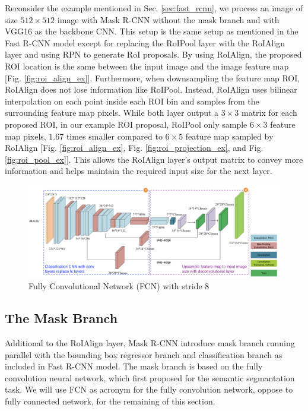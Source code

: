 Reconsider the example mentioned in Sec. \ref{sec:fast_rcnn}, we process an image of size $512 \times 512$ image with Mask R-CNN without the mask branch and with VGG16 as the backbone CNN. This setup is the same setup as mentioned in the Fast R-CNN model except for replacing the RoIPool layer with the RoIAlign layer and using RPN to generate RoI proposals. By using RoIAlign, the proposed ROI location is the same between the input image and the image feature map [Fig. \ref{fig:roi_align_ex}]. Furthermore, when downsampling the feature map ROI, RoIAlign does not lose information like RoIPool. Instead, RoIAlign uses bilinear interpolation on each point inside each ROI bin and samples from the surrounding feature map pixels. While both layer output a $3 \times 3$ matrix for each proposed ROI, in our example ROI proposal, RoIPool only sample $6 \times 3$ feature map pixels, $1.67$ times smaller compared to $6 \times 5$ feature map sampled by RoIAlign [Fig. \ref{fig:roi_align_ex}, Fig. \ref{fig:roi_projection_ex}, and Fig. \ref{fig:roi_pool_ex}]. This allows the RoIAlign layer's output matrix to convey more information and helps maintain the required input size for the next layer.

\begin{figure}[!ht]
    \centering
    \includegraphics[width=5in]{figures/fcn_archite.png}
    \caption{Fully Convolutional Network (FCN) with stride 8 \cite{fcn_archite_2018}} 
    \label{fig:fcn_archite}
\end{figure}

\subsection{The Mask Branch}

Additional to the RoIAlign layer, Mask R-CNN introduce mask branch running parallel with the bounding box regressor branch and classification branch as included in Fast R-CNN model. The mask branch is based on the fully convolution neural network, which first proposed for the semantic segmantation task. We will use FCN as acronym for the fully convolution network, oppose to fully connected network, for the remaining of this section. 

